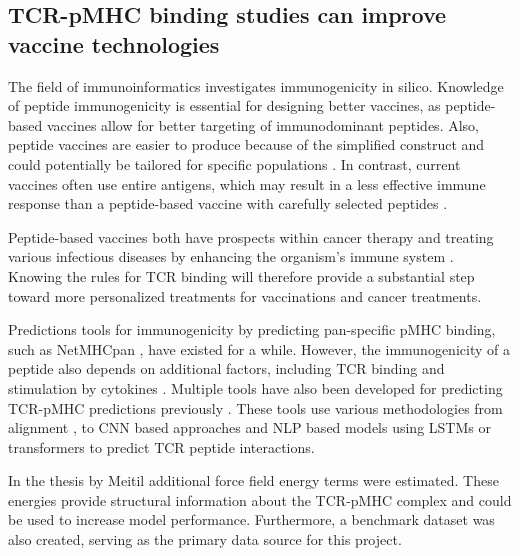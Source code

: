 \subsection{TCR-pMHC binding studies can improve vaccine technologies} \label{studies}
The field of immunoinformatics investigates immunogenicity in silico. Knowledge of peptide immunogenicity is essential for designing better vaccines, as peptide-based vaccines allow for better targeting of immunodominant peptides. Also, peptide vaccines are easier to produce because of the simplified construct and could potentially be tailored for specific populations \cite{Kazi2018CurrentDesign}. In contrast, current vaccines often use entire antigens, which may result in a less effective immune response than a peptide-based vaccine with carefully selected peptides \cite{Patronov2013T-cellImmunoinformatics}. 

Peptide-based vaccines both have prospects within cancer therapy and treating various infectious diseases by enhancing the organism's immune system \cite{DeLuca2007TheImmunotherapy}. Knowing the rules for TCR binding will therefore provide a substantial step toward more personalized treatments for vaccinations and cancer treatments.

Predictions tools for immunogenicity by predicting pan-specific pMHC binding, such as NetMHCpan \cite{Hoof2009NetMHCpanHumans,Reynisson2021NetMHCpan-4.1Data}, have existed for a while. However, the immunogenicity of a peptide also depends on additional factors, including TCR binding and stimulation by cytokines \cite{Murphy2008JanewaysImmunobiology}. Multiple tools have also been developed for predicting TCR-pMHC predictions previously \cite{Montemurro2021NetTCR-2.0Data, Chronister2021TCRMatch:Receptors, Springer2020PredictionPairs, IsabellJurtz2018NetTCR:Networks, Wu2021TCR-BERT:Analyses}. These tools use various methodologies from alignment \cite{Chronister2021TCRMatch:Receptors}, to CNN based approaches \cite{IsabellJurtz2018NetTCR:Networks, Montemurro2021NetTCR-2.0Data} and NLP based models using LSTMs \cite{Springer2020PredictionPairs} or transformers \cite{Wu2021TCR-BERT:Analyses} to predict TCR peptide interactions.

In the thesis by Meitil \cite{Meitil2021UsingPrediction} additional force field energy terms were estimated. These energies provide structural information about the TCR-pMHC complex and could be used to increase model performance. Furthermore, a benchmark dataset was also created, serving as the primary data source for this project. 

